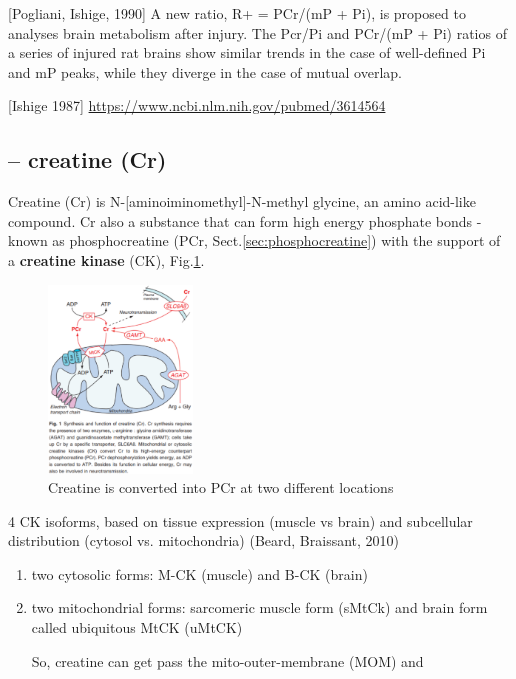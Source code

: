 [Pogliani, Ishige, 1990] A new ratio, R+ = PCr/(mP + Pi), is proposed to
analyses brain metabolism after injury. The Pcr/Pi and PCr/(mP + Pi) ratios of a
series of injured rat brains show similar trends in the case of well-defined Pi
and mP peaks, while they diverge in the case of mutual overlap.

[Ishige 1987] 
\url{https://www.ncbi.nlm.nih.gov/pubmed/3614564}



\subsection{-- creatine (Cr)}
\label{sec:creatine}
\label{sec:creatinine}
\label{sec:creatine-transporter}
\label{sec:SLC6A8}
\label{sec:creatine-kinase}

Creatine (Cr) is N-[aminoiminomethyl]-N-methyl glycine, an amino acid-like
compound. Cr also a substance that can form high energy phosphate bonds - known
as phosphocreatine (PCr, Sect.\ref{sec:phosphocreatine}) with the support of
a {\bf creatine kinase} (CK), Fig.\ref{fig:Cr-Pcr-system}.

\begin{figure}[hbt]
  \centerline{\includegraphics[height=5cm,
    angle=0]{./images/Cr-Pcr-system.eps}}
\caption{Creatine is converted into PCr at two different locations}
\label{fig:Cr-Pcr-system}
\end{figure}

4 CK isoforms, based on tissue expression (muscle vs brain) and subcellular
distribution (cytosol vs. mitochondria) (Beard, Braissant, 2010)
\begin{enumerate}
  \item two cytosolic forms: M-CK (muscle) and B-CK (brain)

  \item two mitochondrial forms: sarcomeric muscle form (sMtCk) and brain form
  called ubiquitous MtCK (uMtCK)


So, creatine can get pass the mito-outer-membrane (MOM) and

\end{enumerate}


